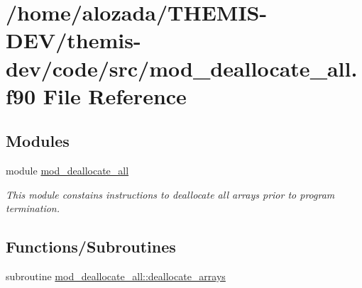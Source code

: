 \hypertarget{mod__deallocate__all_8f90}{}\section{/home/alozada/\+T\+H\+E\+M\+I\+S-\/\+D\+E\+V/themis-\/dev/code/src/mod\+\_\+deallocate\+\_\+all.f90 File Reference}
\label{mod__deallocate__all_8f90}
\subsection*{Modules}
\begin{DoxyCompactItemize}
\item 
module \hyperlink{namespacemod__deallocate__all}{mod\+\_\+deallocate\+\_\+all}
\begin{DoxyCompactList}\small\item\em This module constains instructions to deallocate all arrays prior to program termination. \end{DoxyCompactList}\end{DoxyCompactItemize}
\subsection*{Functions/\+Subroutines}
\begin{DoxyCompactItemize}
\item 
subroutine \hyperlink{namespacemod__deallocate__all_a741dd6416e52cb83db723ea15d7c7dd9}{mod\+\_\+deallocate\+\_\+all\+::deallocate\+\_\+arrays}
\end{DoxyCompactItemize}
